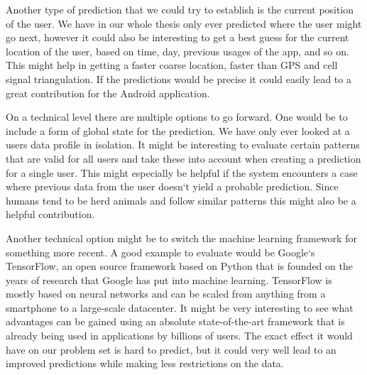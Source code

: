 Another type of prediction that we could try to establish is the current position of the user. We have in our whole thesis only ever predicted where the user might go next, however it could also be interesting to get a best guess for the current location of the user, based on time, day, previous usages of the app, and so on. This might help in getting a faster coarse location, faster than GPS and cell signal triangulation. If the predictions would be precise it could easily lead to a great contribution for the Android application.

On a technical level there are multiple options to go forward. One would be to include a form of global state for the prediction. We have only ever looked at a users data profile in isolation. It might be interesting to evaluate certain patterns that are valid for all users and take these into account when creating a prediction for a single user. This might especially be helpful if the system encounters a case where previous data from the user doesn`t yield a probable prediction. Since humans tend to be herd animals and follow similar patterns this might also be a helpful contribution.

Another technical option might be to switch the machine learning framework for something more recent. A good example to evaluate would be Google`s TensorFlow, an open source framework based on Python that is founded on the years of research that Google has put into machine learning. TensorFlow is mostly based on neural networks and can be scaled from anything from a smartphone to a large-scale datacenter. It might be very interesting to see what advantages can be gained using an absolute state-of-the-art framework that is already being used in applications by billions of users. The exact effect it would have on our problem set is hard to predict, but it could very well lead to an improved predictions while making less restrictions on the data. 